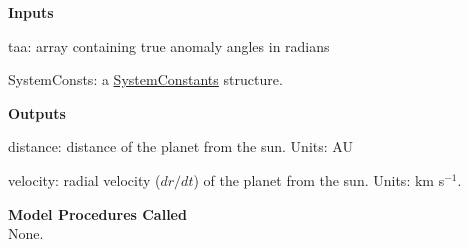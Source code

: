 \documentclass[11pt]{article}
\newcommand\descrip[1]{\textsf{\textbf{\large{#1}}}\\}
\begin{document}
\descrip{Inputs}
\begin{compactenum} \listup
\item taa: array containing true anomaly angles in radians
\item SystemConsts: a \hyperref[sec:systemconstants]{SystemConstants}
structure.
\end{compactenum}

\descrip{Outputs}
\begin{compactenum} \listup
\item distance: distance of the planet from the sun. Units: AU
\item velocity: radial velocity ($dr/dt$) of the planet from the sun. 
Units: km s$^{-1}$.
\end{compactenum}

\descrip{Model Procedures Called}
None.
\end{document}
